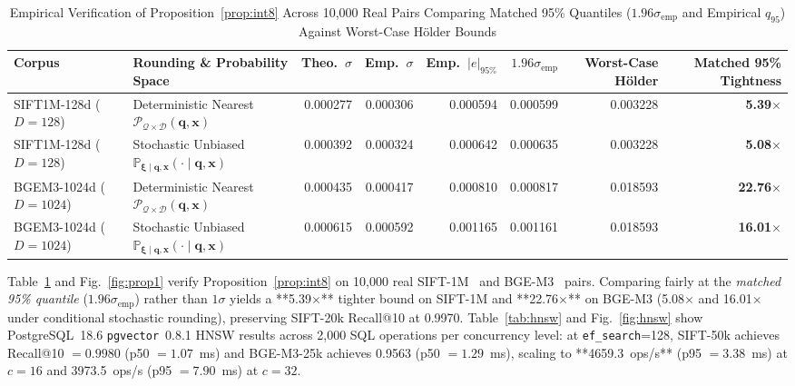 \documentclass[10pt,journal,compsoc]{IEEEtran}
\begin{document}
\begin{table}[!t]
\centering
\caption{Empirical Verification of Proposition~\ref{prop:int8} Across 10,000 Real Pairs Comparing Matched 95\% Quantiles ($1.96\sigma_{\text{emp}}$ and Empirical $q_{95}$) Against Worst-Case H\"older Bounds}
\label{tab:prop1}
\footnotesize
\begin{adjustbox}{max width=\textwidth}
\begin{tabular}{llrrrrrr}
\toprule
\textbf{Corpus} & \textbf{Rounding \& Probability Space} & \textbf{Theo.\ $\sigma$} & \textbf{Emp.\ $\sigma$} & \textbf{Emp.\ $|e|_{95\%}$} & \textbf{$1.96\sigma_{\text{emp}}$} & \textbf{Worst-Case H\"older} & \textbf{Matched 95\% Tightness} \\
\midrule
SIFT1M-128d ($D=128$) & Deterministic Nearest $\mathcal{P}_{\mathcal{Q}\times\mathcal{D}}(\mathbf{q},\mathbf{x})$ & 0.000277 & 0.000306 & 0.000594 & 0.000599 & 0.003228 & \textbf{5.39$\times$} \\
SIFT1M-128d ($D=128$) & Stochastic Unbiased $\mathbb{P}_{\boldsymbol{\xi}\mid\mathbf{q},\mathbf{x}}(\cdot\mid\mathbf{q},\mathbf{x})$ & 0.000392 & 0.000324 & 0.000642 & 0.000635 & 0.003228 & \textbf{5.08$\times$} \\
BGEM3-1024d ($D=1024$) & Deterministic Nearest $\mathcal{P}_{\mathcal{Q}\times\mathcal{D}}(\mathbf{q},\mathbf{x})$ & 0.000435 & 0.000417 & 0.000810 & 0.000817 & 0.018593 & \textbf{22.76$\times$} \\
BGEM3-1024d ($D=1024$) & Stochastic Unbiased $\mathbb{P}_{\boldsymbol{\xi}\mid\mathbf{q},\mathbf{x}}(\cdot\mid\mathbf{q},\mathbf{x})$ & 0.000615 & 0.000592 & 0.001165 & 0.001161 & 0.018593 & \textbf{16.01$\times$} \\
\bottomrule
\end{tabular}
\end{adjustbox}
\end{table}

Table~\ref{tab:prop1} and Fig.~\ref{fig:prop1} verify Proposition~\ref{prop:int8} on 10,000 real SIFT-1M~\cite{jegou2011sift} and BGE-M3~\cite{chen2024bgem3} pairs. Comparing fairly at the \emph{matched 95\% quantile} ($1.96\sigma_{\text{emp}}$) rather than $1\sigma$ yields a **5.39$\times$** tighter bound on SIFT-1M and **22.76$\times$** on BGE-M3 (5.08$\times$ and 16.01$\times$ under conditional stochastic rounding), preserving SIFT-20k Recall@10 at 0.9970. Table~\ref{tab:hnsw} and Fig.~\ref{fig:hnsw} show PostgreSQL~18.6 \texttt{pgvector}~0.8.1 HNSW results across 2,000 SQL operations per concurrency level: at \texttt{ef\_search}=128, SIFT-50k achieves Recall@10 $= 0.9980$ (p50 $= 1.07$~ms) and BGE-M3-25k achieves 0.9563 (p50 $= 1.29$~ms), scaling to **4659.3~ops/s** (p95 $= 3.38$~ms) at $c=16$ and 3973.5~ops/s (p95 $= 7.90$~ms) at $c=32$.
\end{document}
